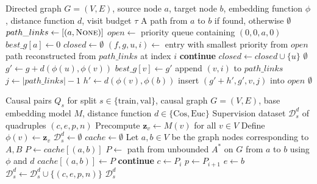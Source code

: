 \begin{algorithm}[H]
\caption{Bounded embedding-guided $A^*$ path search}
\label{alg:bounded-astar-path}
\begin{algorithmic}[1]
\Require Directed graph $G=(V,E)$, source node $a$, target node $b$, embedding function $\phi$, distance function $d$, visit budget $\tau$
\Ensure A path from $a$ to $b$ if found, otherwise $\emptyset$
\State $path\_links \gets [(a,\textsc{None})]$
\State $open \gets$ priority queue containing $(0,0,a,0)$
\State $best\_g[a] \gets 0$
\State $closed \gets \emptyset$
    \State $(f,g,u,i) \gets$ entry with smallest priority from $open$
        \State \Return path reconstructed from $path\_links$ at index $i$
    \EndIf
        \State \textbf{continue}
    \EndIf
    \State $closed \gets closed \cup \{u\}$
        \State \Return $\emptyset$
    \EndIf
        \State $g' \gets g + d(\phi(u),\phi(v))$
            \State $best\_g[v] \gets g'$
            \State append $(v,i)$ to $path\_links$
            \State $j \gets |path\_links|-1$
            \State $h' \gets d(\phi(v),\phi(b))$
            \State insert $(g'+h',g',v,j)$ into $open$
        \EndIf
    \EndFor
\EndWhile
\State \Return $\emptyset$
\end{algorithmic}
\end{algorithm}

\begin{algorithm}[H]
\caption{Construction of search-aligned supervision}
\label{alg:training-dataset}
\begin{algorithmic}[1]
\Require Causal pairs $Q_s$ for split $s\in\{\mathrm{train},\mathrm{val}\}$, causal graph $G=(V,E)$, base embedding model $M$, distance function $d\in\{\mathrm{Cos},\mathrm{Euc}\}$
\Ensure Supervision dataset $\mathcal{D}_s^d$ of quadruples $(c,e,p,n)$
\State Precompute $\mathbf{z}_v \gets M(v)$ for all $v\in V$
\State Define $\phi(v) \gets \mathbf{z}_v$
\State $\mathcal{D}_s^d \gets \emptyset$
\State $cache \gets \emptyset$
    \State Let $a,b\in V$ be the graph nodes corresponding to $A,B$
        \State $P \gets cache[(a,b)]$
    \Else
        \State $P \gets$ path from unbounded $A^*$ on $G$ from $a$ to $b$ using $\phi$ and $d$
        \State $cache[(a,b)] \gets P$
    \EndIf
        \State \textbf{continue}
    \EndIf
        \State $c \gets P_i$
        \State $p \gets P_{i+1}$
        \State $e \gets b$
            \State $\mathcal{D}_s^d \gets \mathcal{D}_s^d \cup \{(c,e,p,n)\}$
        \EndFor
    \EndFor
\EndFor
\State \Return $\mathcal{D}_s^d$
\end{algorithmic}
\end{algorithm}